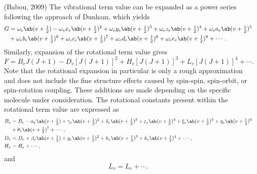 \documentclass[11pt, twoside, fleqn]{report}
\begin{document}
(Babou, 2009)
The vibrational term value can be expanded as a power series following the approach of Dunham, which yields
\begin{align*}
    G & = \omega_{e}\ab(v + \tfrac{1}{2}) - \omega_{e}x_{e}\ab(v + \tfrac{1}{2})^{2} + \omega_{e}y_{e}\ab(v + \tfrac{1}{2})^{3} + \omega_{e}z_{e}\ab(v + \tfrac{1}{2})^{4} + \omega_{e}a_{e}\ab(v + \tfrac{1}{2})^{5} \\
      & + \omega_{e}b_{e}\ab(v + \tfrac{1}{2})^{6} + \omega_{e}c_{e}\ab(v + \tfrac{1}{2})^{7} + \omega_{e}d_{e}\ab(v + \tfrac{1}{2})^{8} + \omega_{e}e_{e}\ab(v + \tfrac{1}{2})^{9} + \dotsb.
\end{align*}
Similarly, expansion of the rotational term value gives
\begin{equation*}
    F = B_{v}J(J + 1) - D_{v}[J(J + 1)]^{2} + H_{v}[J(J + 1)]^{3} + L_{v}[J(J + 1)]^{4} + \dotsb.
\end{equation*}
Note that the rotational expansion in particular is only a rough approximation and does not include the fine structure effects caused by spin-spin, spin-orbit, or spin-rotation coupling. These additions are made depending on the specific molecule under consideration. The rotational constants present within the rotational term value are expressed as
\begin{align*}
    B_{v} & = B_{e} - \alpha_{e}\ab(v + \tfrac{1}{2}) + \gamma_{e}\ab(v + \tfrac{1}{2})^{2} + \delta_{e}\ab(v + \tfrac{1}{2})^{3} + \varepsilon_{e}\ab(v + \tfrac{1}{2})^{4} + \xi_{e}\ab(v + \tfrac{1}{2})^{5} + \eta_{e}\ab(v + \tfrac{1}{2})^{6} \\
          & + \theta_{e}\ab(v + \tfrac{1}{2})^{7} + \dotsb,                                                                                                                                                                                         \\
    D_{v} & = D_{e} + \beta_{e}\ab(v + \tfrac{1}{2}) + g_{e}\ab(v + \tfrac{1}{2})^{2} + h_{e}\ab(v + \tfrac{1}{2})^{3} + k_{e}\ab(v + \tfrac{1}{2})^{4} + \dotsb,                                                                                   \\
    H_{v} & = H_{e} + \dotsb,
\end{align*}
and
\begin{equation*}
    L_{v} = L_{e} + \dotsb.
\end{equation*}
\end{document}
